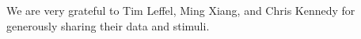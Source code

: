 \documentclass[10pt,letterpaper]{article}
\begin{document}
We are very grateful to Tim Leffel, Ming Xiang, and Chris Kennedy for generously sharing their data and stimuli.

%
%
%
%


%
%
\end{document}
